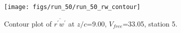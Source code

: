 \begin{figure}[H]
\centering
\texttt{[image: figs/run\_50/run\_50\_rw\_contour]}
\caption{Contour plot of $\overline{r^\prime w^\prime}$ at $z/c$=9.00, $V_{free}$=33.05, station 5.}
\label{fig:run_50_rw_contour}
\end{figure}


